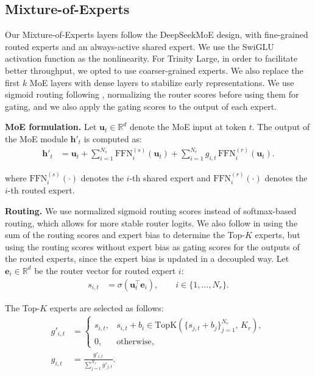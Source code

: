 \documentclass{article}
\begin{document}
\subsection{Mixture-of-Experts}

Our Mixture-of-Experts layers follow the DeepSeekMoE \citep{dai2024deepseekmoeultimateexpertspecialization} design, with fine-grained routed experts and an always-active shared expert. We use the SwiGLU \citep{shazeer2020gluvariantsimprovetransformer} activation function as the nonlinearity. For Trinity Large, in order to facilitate better throughput, we opted to use coarser-grained experts. We also replace the first $k$ MoE layers with dense layers to stabilize early representations. We use sigmoid routing following \cite{wang2024auxiliarylossfreeloadbalancingstrategy}, normalizing the router scores before using them for gating, and we also apply the gating scores to the output of each expert.
    
\noindent\textbf{MoE formulation.}
Let $\mathbf{u}_t\in\mathbb{R}^{d}$ denote the MoE input at token $t$.
The output of the MoE module $\mathbf{h}'_t$ is computed as:
\begin{align}
\mathbf{h}'_t
&=
\mathbf{u}_t
+
\sum_{i=1}^{N_s}\mathrm{FFN}^{(s)}_{i}\!\left(\mathbf{u}_t\right)
+
\sum_{i=1}^{N_r} g_{i,t}\,\mathrm{FFN}^{(r)}_{i}\!\left(\mathbf{u}_t\right).
\tag{15}
\end{align}

where $\mathrm{FFN}^{(s)}_i(\cdot)$ denotes the $i$-th shared expert and $\mathrm{FFN}^{(r)}_i(\cdot)$ denotes the $i$-th routed expert.

\noindent\textbf{Routing.}
We use normalized sigmoid routing scores instead of softmax-based routing, which allows for more stable router logits. We also follow \cite{wang2024auxiliarylossfreeloadbalancingstrategy} in using the sum of the routing scores and expert bias to determine the Top-$K$ experts, but using the routing scores without expert bias as gating scores for the outputs of the routed experts, since the expert bias is updated in a decoupled way.
Let $\mathbf{e}_i\in\mathbb{R}^{d}$ be the router vector for routed expert $i$:
\begin{align}
s_{i,t}
&=
\sigma\!\left(\mathbf{u}_t^{\top}\mathbf{e}_i\right),
\qquad i\in\{1,\dots,N_r\}.
\tag{16}
\end{align}

The Top-$K$ experts are selected as follows:
\begin{align}
g'_{i,t}
&=
\begin{cases}
s_{i,t},
&
s_{i,t} + b_i \in \mathrm{TopK}\!\left(\{s_{j,t}+b_j\}_{j=1}^{N_r},\,K_r\right),
\\[0.2em]
0,
&
\text{otherwise},
\end{cases}
\tag{17}\\
g_{i,t}
&=
\frac{g'_{i,t}}{\sum_{j=1}^{N_r} g'_{j,t}}.
\tag{18}
\end{align}
\end{document}
